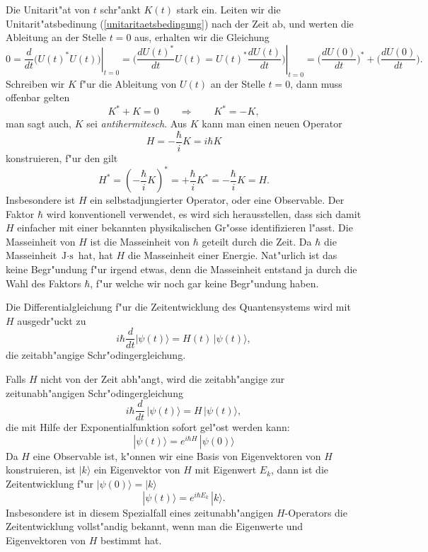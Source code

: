 Die Unitarit"at von $t$ schr"ankt $K(t)$ stark ein. Leiten wir die
Unitarit"atsbedinung (\ref{unitaritaetsbedingung}) nach der Zeit ab,
und werten die Ableitung an der Stelle $t=0$ aus,
erhalten wir die Gleichung
\[
0
=
\left.\frac{d}{dt}\bigl(U(t)^*U(t)\bigr)\right|_{t=0}
=
\left.
\biggl(
\frac{dU(t)^*}{dt}U(t)=U(t)^*\frac{dU(t)}{dt}
\biggr)
\right|_{t=0}
=
\biggl(\frac{dU(0)}{dt}\biggr)^*
+
\biggl(\frac{dU(0)}{dt}\biggr).
\]
Schreiben wir $K$ f"ur die Ableitung von $U(t)$ an der Stelle $t=0$,
dann muss offenbar gelten
\[
K^*+K=0\qquad\Rightarrow\qquad K^*=-K,
\]
man sagt auch, $K$ sei {\em antihermitesch}. Aus $K$ kann man einen
neuen Operator
\[
H=-\frac{\hbar}{i}K=i\hbar K
\]
konstruieren, f"ur den gilt
\[
H^*
=
\left(-\frac{\hbar}{i}K\right)^*
=
+\frac{\hbar}{i}K^*
=
-\frac{\hbar}{i}K=H.
\]
Insbesondere ist $H$ ein selbstadjungierter Operator, oder
eine Observable.
Der Faktor $\hbar$ wird konventionell verwendet, es wird sich
herausstellen, dass sich damit $H$ einfacher mit einer bekannten
physikalischen Gr"osse identifizieren l"asst.
Die Masseinheit von $H$ ist die Masseinheit von $\hbar$ geteilt durch die Zeit.
Da $\hbar$ die Masseinheit $\text{J}\cdot\text{s}$ hat, hat
$H$ die Masseinheit einer Energie.
Nat"urlich ist das keine Begr"undung f"ur irgend etwas, denn die
Masseinheit entstand ja durch die Wahl des Faktors $\hbar$, f"ur
welche wir noch gar keine Begr"undung haben.

Die Differentialgleichung f"ur die Zeitentwicklung des Quantensystems wird
mit $H$ ausgedr"uckt zu
\begin{equation}
i\hbar\frac{d}{dt}|\psi(t)\rangle = H(t)\,|\psi(t)\rangle,
\label{schroedingergleichungt}
\end{equation}
die {\rm zeitabh"angige Schr"odingergleichung}.

Falls $H$ nicht von der Zeit abh"angt, wird die zeitabh"angige zur
zeitunabh"angigen Schr"odingergleichung
\begin{equation}
i\hbar \frac{d}{dt}\,|\psi(t)\rangle = H\,|\psi(t)\rangle,
\label{schroedingergleichung}
\end{equation}
die mit Hilfe der Exponentialfunktion sofort gel"ost werden kann:
\[
|\psi(t)\rangle = e^{i\hbar H}\,|\psi(0)\rangle
\]
Da $H$ eine Observable ist, k"onnen wir eine Basis von Eigenvektoren
von $H$ konstruieren, ist $|k\rangle$ ein Eigenvektor von $H$ mit
Eigenwert $E_k$, dann ist die Zeitentwicklung f"ur $|\psi(0)\rangle = |k\rangle$
\[
|\psi(t)\rangle
=
e^{i\hbar E_k}\,|k\rangle.
\]
Insbesondere ist in diesem Spezialfall eines zeitunabh"angigen $H$-Operators
die Zeitentwicklung vollst"andig bekannt, wenn man die Eigenwerte und
Eigenvektoren von $H$ bestimmt hat.

